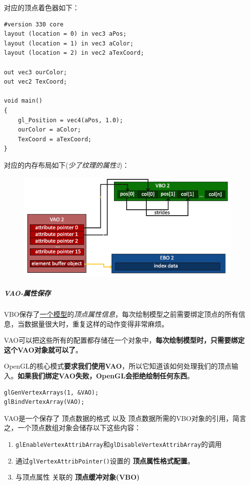 \documentclass[UTF8,a4paper,12pt]{ctexbook}
\begin{document}
					
					对应的顶点着色器如下：
					\begin{lstlisting}
#version 330 core
layout (location = 0) in vec3 aPos;
layout (location = 1) in vec3 aColor;
layout (location = 2) in vec2 aTexCoord;

out vec3 ourColor;
out vec2 TexCoord;

void main()
{
    gl_Position = vec4(aPos, 1.0);
    ourColor = aColor;
    TexCoord = aTexCoord;
}					
					\end{lstlisting}
					
					对应的内存布局如下(\textit{少了纹理的属性2})：
					
					\begin{figure}[H]
						\centering
						\includegraphics[width=.9\linewidth]{vertexAttribute}
					\end{figure}
					
					
					
					
					
					
					
				\subparagraph{VAO-属性保存}	
					VBO保存了\underline{一个模型}的\textit{顶点属性信息}，每次绘制模型之前需要绑定顶点的所有信息，当数据量很大时，重复这样的动作变得非常麻烦。
					
					VAO可以把这些所有的配置都存储在一个对象中，\textbf{每次绘制模型时，只需要绑定这个VAO对象就可以了}。
					
					OpenGL的核心模式\textbf{要求我们使用VAO}，所以它知道该如何处理我们的顶点输入。\textbf{如果我们绑定VAO失败，OpenGL会拒绝绘制任何东西}。
					
					\begin{lstlisting}
glGenVertexArrays(1, &VAO);			
glBindVertexArray(VAO);		
					\end{lstlisting}
					
					VAO是一个保存了 顶点数据的格式 以及 顶点数据所需的VBO对象的引用，简言之，一个顶点数组对象会储存以下这些内容：
					\begin{enumerate}
						\item \verb|glEnableVertexAttribArray|和\verb|glDisableVertexAttribArray|的调用
						\item 通过\verb|glVertexAttribPointer()|设置的 \textbf{顶点属性格式配置}。
						\item 与顶点属性 关联的 \textbf{顶点缓冲对象(VBO)}
					\end{enumerate}
					
\end{document}
